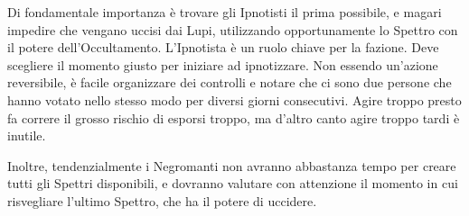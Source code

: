 \documentclass[a4paper,10pt]{article}
\begin{document}
Di fondamentale importanza è trovare gli Ipnotisti il prima possibile, e magari impedire che vengano uccisi dai Lupi, utilizzando opportunamente lo Spettro con il potere dell'Occultamento. L'Ipnotista è un ruolo chiave per la fazione. Deve scegliere il momento giusto per iniziare ad ipnotizzare. Non essendo un'azione reversibile, è facile organizzare dei controlli e notare che ci sono due persone che hanno votato nello stesso modo per diversi giorni consecutivi. Agire troppo presto fa correre il grosso rischio di esporsi troppo, ma d'altro canto agire troppo tardi è inutile.

Inoltre, tendenzialmente i Negromanti non avranno abbastanza tempo per creare tutti gli Spettri disponibili, e dovranno valutare con attenzione il momento in cui risvegliare l'ultimo Spettro, che ha il potere di uccidere.
\end{document}
